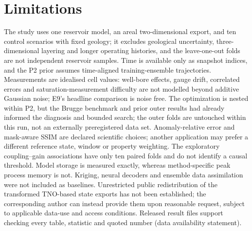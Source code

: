 \section{Limitations}
\label{sec:limitations}
The study uses one reservoir model, an areal two-dimensional export, and ten control scenarios with fixed geology; it excludes geological uncertainty, three-dimensional layering and longer operating histories, and the leave-one-out folds are not independent reservoir samples. Time is available only as snapshot indices, and the P2 prior assumes time-aligned training-ensemble trajectories. Measurements are idealised cell values: well-bore effects, gauge drift, correlated errors and saturation-measurement difficulty are not modelled beyond additive Gaussian noise; E9's headline comparison is noise free. The optimization is nested within P2, but the Brugge benchmark and prior outer results had already informed the diagnosis and bounded search; the outer folds are untouched within this run, not an externally preregistered data set. Anomaly-relative error and mask-aware SSIM are declared scientific choices; another application may prefer a different reference state, window or property weighting. The exploratory coupling--gain associations have only ten paired folds and do not identify a causal threshold. Model storage is measured exactly, whereas method-specific peak process memory is not. Kriging, neural decoders \cite{fukami2021,zou2025prosnet} and ensemble data assimilation \cite{evensen2009} were not included as baselines. Unrestricted public redistribution of the transformed TNO-based state exports has not been established; the corresponding author can instead provide them upon reasonable request, subject to applicable data-use and access conditions. Released result files support checking every table, statistic and quoted number (data availability statement).
